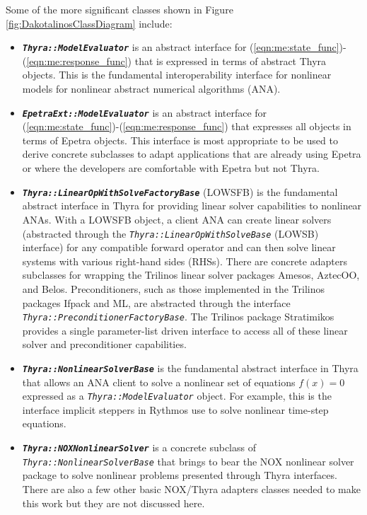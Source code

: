 \documentclass[pdf,ps2pdf,11pt]{SANDreport}
\begin{document}
Some of the more significant classes shown in Figure
{}\ref{fig:DakotalinosClassDiagram} include:

\begin{itemize}

{}\item\textbf{\texttt{\textit{Thyra::ModelEvaluator}}} is an abstract
interface for (\ref{eqn:me:state_func})-(\ref{eqn:me:response_func}) that is
expressed in terms of abstract Thyra objects.  This is the fundamental
interoperability interface for nonlinear models for nonlinear abstract
numerical algorithms (ANA).

{}\item\textbf{\texttt{\textit{EpetraExt::ModelEvaluator}}} is an abstract
interface for (\ref{eqn:me:state_func})-(\ref{eqn:me:response_func}) that
expresses all objects in terms of Epetra objects.  This interface is most
appropriate to be used to derive concrete subclasses to adapt applications
that are already using Epetra or where the developers are comfortable with
Epetra but not Thyra.

{}\item\textbf{\texttt{\textit{Thyra::LinearOpWithSolveFactoryBase}}} (LOWSFB)
is the fundamental abstract interface in Thyra for providing linear solver
capabilities to nonlinear ANAs.  With a LOWSFB object, a client ANA can create
linear solvers (abstracted through the
{}\texttt{\textit{Thyra::\-Linear\-Op\-With\-Solve\-Base}} (LOWSB) interface)
for any compatible forward operator and can then solve linear systems with
various right-hand sides (RHSs).  There are concrete adapters subclasses for
wrapping the Trilinos linear solver packages Amesos, AztecOO, and Belos.
Preconditioners, such as those implemented in the Trilinos packages Ifpack and
ML, are abstracted through the interface
{}\texttt{\textit{Thyra::\-Preconditioner\-Factory\-Base}}.  The Trilinos
package Stratimikos provides a single parameter-list driven interface to
access all of these linear solver and preconditioner capabilities.

{}\item\textbf{\texttt{\textit{Thyra::NonlinearSolverBase}}} is the
fundamental abstract interface in Thyra that allows an ANA client to solve a
nonlinear set of equations $f(x)=0$ expressed as a
{}\texttt{\textit{Thyra\-::Model\-Evaluator}} object.  For example, this is
the interface implicit steppers in Rythmos use to solve nonlinear time-step
equations.

{}\item\textbf{\texttt{\textit{Thyra::NOXNonlinearSolver}}} is a concrete
subclass of {}\texttt{\textit{Thyra::NonlinearSolverBase}} that brings to bear
the NOX nonlinear solver package to solve nonlinear problems presented through
Thyra interfaces.  There are also a few other basic NOX/Thyra adapters classes
needed to make this work but they are not discussed here.


\end{itemize}
\end{document}
